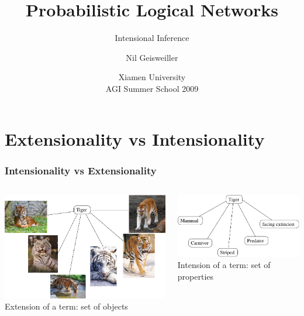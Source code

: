 \documentclass{beamer}
\title{Probabilistic Logical Networks}
\subtitle{Intensional Inference}
\author{Nil Geisweiller}
\institute[Xiamen University] %
{
  Novamente LLC
}
\date[Xiamen University AGI Summer School 2009] %
{Xiamen University\\ AGI Summer School 2009}
\begin{document}
\frame
{
  \maketitle
}
\section[Outline]{}
\frame{\tableofcontents}

\section{Extensionality vs Intensionality}

\frame
{
  \frametitle{Intensionality vs Extensionality}

  \begin{columns}
    \column{1.5in}
    \includegraphics[scale=0.3]{extension_tiger.pdf}\\
    \alert{Extension} of a term: set of \alert{objects}

    \column{1.5in}

    \includegraphics[scale=0.4]{intension_tiger.pdf}\\
    \alert{Intension} of a term: set of \alert{properties}
  \end{columns}


}
\end{document}
